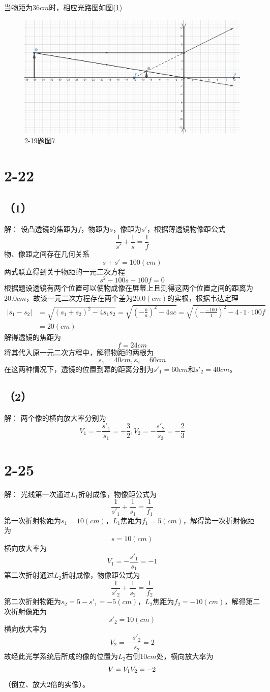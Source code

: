 \documentclass[10pt,a4paper]{article}
\theoremstyle{remark}
\begin{document}
当物距为$36cm$时，相应光路图如图(\ref{FigureofProblem2-19_7})
\begin{figure}
\centering
\includegraphics[scale=.15]{OpticsHomework_2_2-19_7(tailored).png}
\caption{2-19题图7}\label{FigureofProblem2-19_7}
\end{figure}

\section*{2-22}
\subsection*{（1）}解：
设凸透镜的焦距为$f$，物距为$s$，像距为$s'$，根据薄透镜物像距公式
\[
\frac{1}{s'} + \frac{1}{s} = \frac{1}{f}
\]
物、像距之间存在几何关系
\[
s + s' = 100(cm)
\]
两式联立得到关于物距的一元二次方程
\[
s^2 - 100s + 100f = 0
\]
根据题设透镜有两个位置可以使物成像在屏幕上且测得这两个位置之间的距离为$20.0cm$，故该一元二次方程存在两个差为$20.0(cm)$的实根，根据韦达定理
\begin{align*}
|s_1 - s_2| &= \sqrt{(s_1 + s_2)^2 - 4s_1s_2} = \sqrt{(-\frac{b}{a})^2 - 4ac} = \sqrt{(-\frac{-100}{1})^2 - 4\cdot1\cdot100f}\\
&= 20(cm)
\end{align*}
解得透镜的焦距为
\[
f = 24cm
\]
将其代入原一元二次方程中，解得物距的两根为
\[
s_1 = 40cm, s_2 = 60cm
\]
在这两种情况下，透镜的位置到幕的距离分别为$s'_1 = 60cm$和$s'_2 = 40cm$。
\subsection*{（2）}解：
两个像的横向放大率分别为
\[
V_1 = -\frac{s'_1}{s_1} = -\frac{3}{2}, V_2 = -\frac{s'_2}{s_2} = -\frac{2}{3}
\]
\section*{2-25}解：
光线第一次通过$L_1$折射成像，物像距公式为
\[
\frac{1}{s'_1} + \frac{1}{s_1} = \frac{1}{f_1}
\]
第一次折射物距为$s_1 = 10(cm)$，$L_1$焦距为$f_1 = 5(cm)$，解得第一次折射像距为
\[
s = 10(cm)
\]
横向放大率为
\[
V_1 = -\frac{s'_1}{s_1} = -1
\]
第二次折射通过$L_2$折射成像，物像距公式为
\[
\frac{1}{s'_2} + \frac{1}{s_2} = \frac{1}{f_2}
\]
第二次折射物距为$s_2 = 5 - s'_1 = -5(cm)$，$L_2$焦距为$f_2 = -10(cm)$，解得第二次折射像距为
\[
s'_2 = 10(cm)
\]
横向放大率为
\[
V_2 = -\frac{s'_2}{s_2} = 2
\]
故经此光学系统后所成的像的位置为$L_2$右侧$10cm$处，横向放大率为
\[
V = V_1V_2\\= -2
\]
（倒立、放大$2$倍的实像）。
\end{document}
